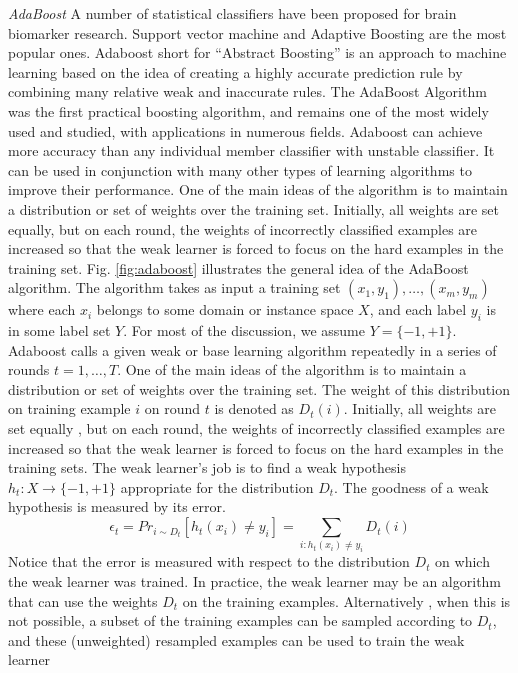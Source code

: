 \documentclass[authoryear,preprint,revi	ew,12pt]{elsarticle}
\begin{document}
\textit{AdaBoost}
A number of statistical classifiers have been proposed for brain biomarker research. Support vector machine and Adaptive Boosting are the most popular ones. Adaboost short for ``Abstract Boosting'' is an approach to machine learning based on the idea of creating a highly accurate prediction rule by combining many relative weak and inaccurate rules. The AdaBoost Algorithm~\citep{freund1996experiments} was the first practical boosting algorithm, and remains one of the most widely used and studied, with applications in numerous fields. Adaboost can achieve more accuracy than any individual member classifier with unstable classifier. It can be used in conjunction with many other types of learning algorithms to improve their performance. One of the main ideas of the algorithm is to maintain a distribution or set of weights over the training set.  Initially, all weights are set equally, but on each round, the weights of incorrectly classified examples are increased so that the weak learner is forced to focus on the hard examples in the training set. Fig. \ref{fig:adaboost} illustrates the general idea of the AdaBoost algorithm. The algorithm takes as input a training set $ (x_1,y_1), \dots , (x_m,y_m) $ where each $ x_i $ belongs to some domain or instance space $ X $, and each label $ y_i $ is in some label set $ Y $. For most of the discussion, we assume $ Y = \{-1, +1\} $. Adaboost calls a given weak or base learning  algorithm repeatedly in a series of rounds $ t = 1,\dots,T $. One of the main ideas of the algorithm is to maintain a distribution or set of weights over the training set. The weight of this distribution on training example $ i $ on round $ t $ is denoted as $ D_t(i) $. Initially, all weights are set equally , but on each round, the weights of incorrectly classified examples are increased so that the weak learner is forced to focus on the hard examples in the training sets.
The weak learner's job is to find a weak hypothesis $ h_t : X \to \{-1 ,+1\}$ appropriate for the distribution $ D_t $. The goodness of a weak hypothesis is measured by its error.
$$ \epsilon_t = Pr_{i \sim D_t}[h_t(x_i) \neq y_i] = \underset{i:h_t(x_i) \neq y_i}{\sum} D_t(i)  $$
Notice that the error is measured with respect to the distribution $ D_t $ on which the weak learner was trained. In practice, the weak learner may be an algorithm that can use the weights $ D_t $ on the training examples. Alternatively , when this is not possible, a subset of the training examples can be sampled according to $ D_t $, and these (unweighted) resampled examples can be used to train the weak learner~\cite{schapire2013explaining}
\end{document}
